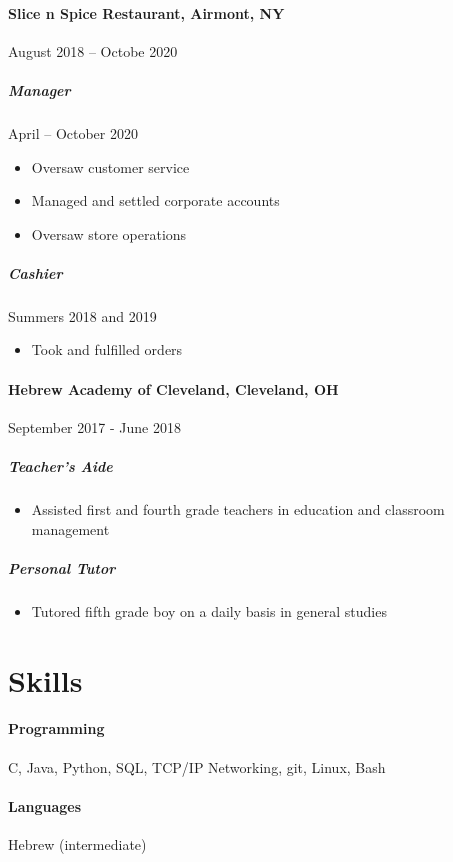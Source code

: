 \documentclass[12pt]{article}
\begin{document}
\paragraph*{Slice n Spice Restaurant, Airmont, NY} \hfill August 2018 – Octobe
 2020
\subparagraph*{Manager} \hfill April – October 2020
\begin{itemize}
    \item Oversaw customer service
    \item Managed and settled corporate accounts
    \item Oversaw store operations
\end{itemize}
\subparagraph*{Cashier} \hfill Summers 2018 and 2019
\begin{itemize}
    \item Took and fulfilled orders
\end{itemize}

\paragraph*{Hebrew Academy of Cleveland, Cleveland, OH} \hfill September
2017 - June 2018
\subparagraph*{Teacher's Aide}
\begin{itemize}
    \item Assisted first and fourth grade teachers in education and classroom
    management
\end{itemize}
\subparagraph*{Personal Tutor}
\begin{itemize}
    \item Tutored fifth grade boy on a daily basis in general studies
\end{itemize}


\vfill
\section*{Skills}

\paragraph*{Programming}
C, Java, Python, SQL, TCP/IP Networking, git, Linux, Bash
\paragraph*{Languages}
Hebrew (intermediate)
\end{document}

